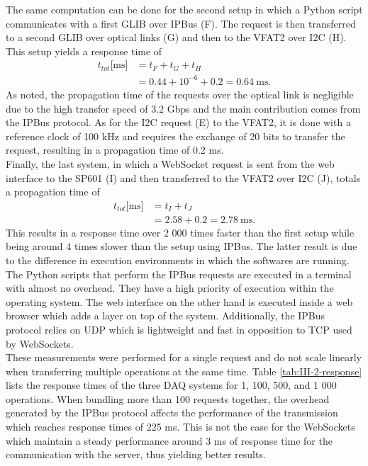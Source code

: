       The same computation can be done for the second setup in which a Python script communicates with a first GLIB over IPBus (F). The request is then transferred to a second GLIB over optical links (G) and then to the VFAT2 over I2C (H). This setup yields a response time of
      \begin{equation}
        \begin{split}
          t_{tot}\text{[ms]} & = t_F + t_G + t_H \\
                             & = 0.44 + 10^{-6} + 0.2 = 0.64 \ \text{ms}.
        \end{split}
      \end{equation}
      As noted, the propagation time of the requests over the optical link is negligible due to the high transfer speed of 3.2 Gbps and the main contribution comes from the IPBus protocol. As for the I2C request (E) to the VFAT2, it is done with a reference clock of 100 kHz and requires the exchange of 20 bits to transfer the request, resulting in a propagation time of 0.2 ms. \\

      Finally, the last system, in which a WebSocket request is sent from the web interface to the SP601 (I) and then transferred to the VFAT2 over I2C (J), totals a propagation time of
      \begin{equation}
        \begin{split}
          t_{tot}\text{[ms]} & = t_I + t_J \\
                             & = 2.58 + 0.2 = 2.78 \ \text{ms}.
        \end{split}
      \end{equation}
      This results in a response time over 2 000 times faster than the first setup while being around 4 times slower than the setup using IPBus. The latter result is due to the difference in execution environments in which the softwares are running. The Python scripts that perform the IPBus requests are executed in a terminal with almost no overhead. They have a high priority of execution within the operating system. The web interface on the other hand is executed inside a web browser which adds a layer on top of the system. Additionally, the IPBus protocol relies on UDP which is lightweight and fast in opposition to TCP used by WebSockets. \\

      These measurements were performed for a single request and do not scale linearly when transferring multiple operations at the same time. Table \ref{tab:III-2-response} lists the response times of the three DAQ systems for 1, 100, 500, and 1 000 operations. When bundling more than 100 requests together, the overhead generated by the IPBus protocol affects the performance of the transmission which reaches response times of 225 ms. This is not the case for the WebSockets which maintain a steady performance around 3 ms of response time for the communication with the server, thus yielding better results.

